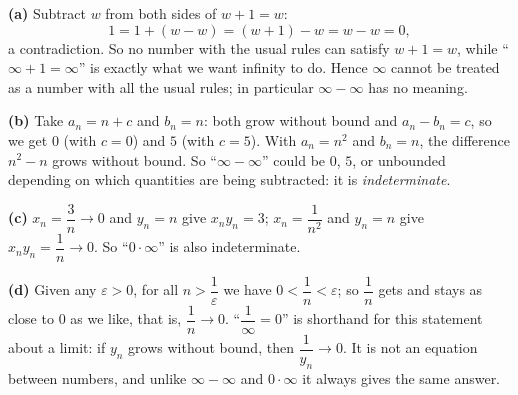 \textbf{(a)} Subtract $w$ from both sides of $w+1=w$:
\[
1=1+(w-w)=(w+1)-w=w-w=0,
\]
a contradiction. So no number with the usual rules can satisfy $w+1=w$, while ``$\infty+1=\infty$'' is exactly what we want infinity to do. Hence $\infty$ cannot be treated as a number with all the usual rules; in particular $\infty-\infty$ has no meaning.

\textbf{(b)} Take $a_n=n+c$ and $b_n=n$: both grow without bound and $a_n-b_n=c$, so we get $0$ (with $c=0$) and $5$ (with $c=5$). With $a_n=n^2$ and $b_n=n$, the difference $n^2-n$ grows without bound. So ``$\infty-\infty$'' could be $0$, $5$, or unbounded depending on which quantities are being subtracted: it is \emph{indeterminate}.

\textbf{(c)} $x_n=\dfrac{3}{n}\to0$ and $y_n=n$ give $x_ny_n=3$; $x_n=\dfrac{1}{n^2}$ and $y_n=n$ give $x_ny_n=\dfrac{1}{n}\to0$. So ``$0\cdot\infty$'' is also indeterminate.

\textbf{(d)} Given any $\varepsilon>0$, for all $n>\dfrac{1}{\varepsilon}$ we have $0<\dfrac{1}{n}<\varepsilon$; so $\dfrac{1}{n}$ gets and stays as close to $0$ as we like, that is, $\dfrac{1}{n}\to0$. ``$\dfrac{1}{\infty}=0$'' is shorthand for this statement about a limit: if $y_n$ grows without bound, then $\dfrac{1}{y_n}\to0$. It is not an equation between numbers, and unlike $\infty-\infty$ and $0\cdot\infty$ it always gives the same answer.
